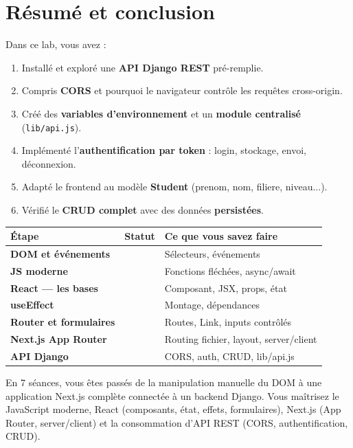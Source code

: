 \documentclass[11pt,a4paper]{article}
\newcommand{\cmark}{\ding{51}}
\begin{document}
\newpage

\section{Résumé et conclusion}

Dans ce lab, vous avez :
\begin{enumerate}[nosep]
\item Installé et exploré une \textbf{API Django REST} pré-remplie.
\item Compris \textbf{CORS} et pourquoi le navigateur contrôle les requêtes cross-origin.
\item Créé des \textbf{variables d'environnement} et un \textbf{module centralisé} (\texttt{lib/api.js}).
\item Implémenté l'\textbf{authentification par token} : login, stockage, envoi, déconnexion.
\item Adapté le frontend au modèle \textbf{Student} (prenom, nom, filiere, niveau...).
\item Vérifié le \textbf{CRUD complet} avec des données \textbf{persistées}.
\end{enumerate}

\begin{center}
\begin{tabular}{lcp{6.5cm}}
\toprule
\textbf{Étape} & \textbf{Statut} & \textbf{Ce que vous savez faire} \\
\midrule
\textbf{DOM et événements} & \cmark{} & Sélecteurs, événements \\
\textbf{JS moderne} & \cmark{} & Fonctions fléchées, async/await \\
\textbf{React --- les bases} & \cmark{} & Composant, JSX, props, état \\
\textbf{useEffect} & \cmark{} & Montage, dépendances \\
\textbf{Router et formulaires} & \cmark{} & Routes, Link, inputs contrôlés \\
\textbf{Next.js App Router} & \cmark{} & Routing fichier, layout, server/client \\
\textbf{API Django} & \cmark{} & CORS, auth, CRUD, lib/api.js \\
\bottomrule
\end{tabular}
\end{center}

\begin{projetbox}
En 7 séances, vous êtes passés de la manipulation manuelle du DOM à une application Next.js complète connectée à un backend Django. Vous maîtrisez le JavaScript moderne, React (composants, état, effets, formulaires), Next.js (App Router, server/client) et la consommation d'API REST (CORS, authentification, CRUD).
\end{projetbox}
\end{document}
